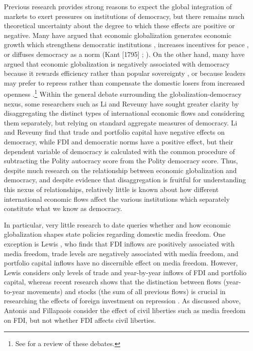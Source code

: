 \documentclass[12pt,a4paper]{article}\usepackage[]{graphicx}\usepackage[]{color}
\begin{document}
Previous research provides strong reasons to expect the global integration of markets to exert pressures on institutions of democracy, but there remains much theoretical uncertainty about the degree to which these effects are positive or negative. Many have argued that economic globalization generates economic growth which strengthens democratic institutions \parencites{Baghwati:1997vy}{Im:1996cl}, increases incentives for peace \parencites{Baghwati:1997vy}{Oneal:1999fc}, or diffuses democracy as a norm (Kant [1795] \cite*{Kant:1983uf}; \cite{Limongi:1996dr}). On the other hand, many have argued that economic globalization is negatively associated with democracy because it rewards efficiency rather than popular sovereignty \parencites{Huntington:1975vt}{Lindblom:1977ue}{Cammack:1998gf}, or because leaders may prefer to repress rather than compensate the domestic losers from increased openness \parencite{Adsera:2002vt}.\footnote{See \cite{Milner:2009hi} for a review of these debates.} Within the general debate surrounding the globalization-democracy nexus, some researchers such as Li and Reveuny \parencite*{Li:2003vj} have sought greater clarity by disaggregating the distinct types of international economic flows and considering them separately, but relying on standard aggregate measures of democracy. Li and Reveuny find that trade and portfolio capital have negative effects on democracy, while FDI and democratic norms have a positive effect, but their dependent variable of democracy is calculated with the common procedure of subtracting the Polity autocracy score from the Polity democracy score. Thus, despite much research on the relationship between economic globalization and democracy, and despite evidence that disaggregation is fruitful for understanding this nexus of relationships, relatively little is known about how different international economic flows affect the various institutions which separately constitute what we know as democracy.

In particular, very little research to date queries whether and how economic globalization shapes state policies regarding domestic media freedom. One exception is Lewis \parencite*{Lewis:qDvYbWlU}, who finds that FDI inflows are positively associated with media freedom, trade levels are negatively associated with media freedom, and portfolio capital inflows have no discernible effect on media freedom. However, Lewis considers only levels of trade and year-by-year inflows of FDI and portfolio capital, whereas recent research shows that the distinction between flows (year-to-year movements) and stocks (the sum of all previous flows) is crucial in researching the effects of foreign investment on repression \parencite{Sorens:2012hc}. As discussed above, Antonis and Fillapaois \parencite*{Adam:2007gn} consider the effect of civil liberties such as media freedom on FDI, but not whether FDI affects civil liberties.
\end{document}
